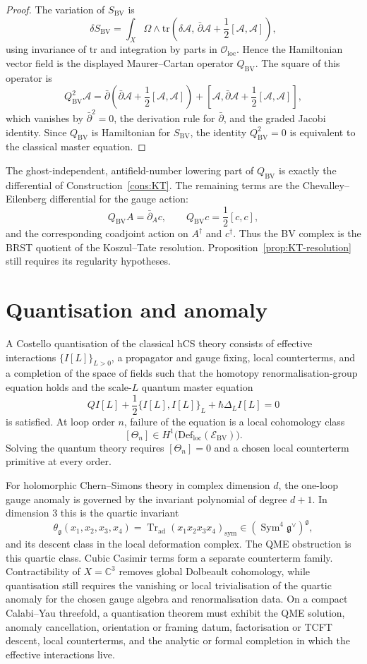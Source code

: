 \documentclass[11pt]{amsart}
\providecommand{\C}{\mathbb{C}}
\providecommand{\cE}{\mathcal{E}}
\providecommand{\cO}{\mathcal{O}}
\providecommand{\BV}{\mathrm{BV}}
\providecommand{\Def}{\mathrm{Def}}
\providecommand{\dbar}{\bar{\partial}}
\providecommand{\g}{\mathfrak{g}}
\providecommand{\tr}{\mathrm{tr}}
\theoremstyle{plain}
\theoremstyle{definition}
\begin{document}
\begin{proof}
The variation of \(S_{\BV}\) is
\[
  \delta S_{\BV}
  =
  \int_X\Omega\wedge
  \tr\!\left(\delta\mathcal A,\,
  \dbar\mathcal A+\frac12[\mathcal A,\mathcal A]\right),
\]
using invariance of \(\tr\) and integration by parts in
\(\cO_{\mathrm{loc}}\). Hence the Hamiltonian vector field is the
displayed Maurer--Cartan operator \(Q_{\BV}\). The square of this
operator is
\[
  Q_{\BV}^2\mathcal A
  =
  \dbar\!\left(\dbar\mathcal A+\frac12[\mathcal A,\mathcal A]\right)
  +
  [\mathcal A,\dbar\mathcal A+\frac12[\mathcal A,\mathcal A]],
\]
which vanishes by \(\dbar^2=0\), the derivation rule for \(\dbar\), and
the graded Jacobi identity. Since \(Q_{\BV}\) is Hamiltonian for
\(S_{\BV}\), the identity \(Q_{\BV}^2=0\) is equivalent to the classical
master equation.
\end{proof}

The ghost-independent, antifield-number lowering part of \(Q_{\BV}\) is
exactly the differential of Construction~\ref{cons:KT}. The remaining
terms are the Chevalley--Eilenberg differential for the gauge action:
\[
  Q_{\BV}A=\dbar_Ac,\qquad
  Q_{\BV}c=\frac12[c,c],
\]
and the corresponding coadjoint action on \(A^\dagger\) and
\(c^\dagger\). Thus the BV complex is the BRST quotient of the
Koszul--Tate resolution. Proposition~\ref{prop:KT-resolution} still
requires its regularity hypotheses.

\section{Quantisation and anomaly}

A Costello quantisation of the classical hCS theory consists of
effective interactions
\(\{I[L]\}_{L>0}\), a propagator and gauge fixing, local counterterms,
and a completion of the space of fields such that the homotopy
renormalisation-group equation holds and the scale-\(L\) quantum master
equation
\[
  QI[L]+\frac12\{I[L],I[L]\}_L+\hbar\Delta_L I[L]=0
\]
is satisfied. At loop order \(n\), failure of the equation is a local
cohomology class
\[
  [\Theta_n]\in H^1\bigl(\Def_{\mathrm{loc}}(\cE_{\BV})\bigr).
\]
Solving the quantum theory requires \([\Theta_n]=0\) and a chosen local
counterterm primitive at every order.

For holomorphic Chern--Simons theory in complex dimension \(d\), the
one-loop gauge anomaly is governed by the invariant polynomial of degree
\(d+1\). In dimension \(3\) this is the quartic invariant
\[
  \theta_{\g}(x_1,x_2,x_3,x_4)
  =
  \operatorname{Tr}_{\mathrm{ad}}
  (x_1x_2x_3x_4)_{\mathrm{sym}}
  \in (\operatorname{Sym}^4\g^\vee)^\g ,
\]
and its descent class in the local deformation complex. The QME
obstruction is this quartic class. Cubic Casimir terms form a separate
counterterm family. Contractibility of \(X=\C^3\) removes global
Dolbeault cohomology, while quantisation still requires the vanishing or
local trivialisation of the quartic anomaly for the chosen gauge algebra
and renormalisation data. On a compact Calabi--Yau threefold, a
quantisation theorem must exhibit the QME solution, anomaly
cancellation, orientation or framing datum, factorisation or TCFT
descent, local counterterms, and the analytic or formal completion in
which the effective interactions live.
\end{document}
